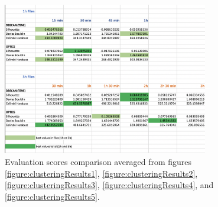 





\begin{figure}
  \centering
  \includegraphics[width=0.8\textwidth]{./images/clusteringResults/clusteringResults6.png}
  \caption{Evaluation scores comparison averaged from figures \ref{figure:clusteringResults1}, \ref{figure:clusteringResults2}, \ref{figure:clusteringResults3}, \ref{figure:clusteringResults4}, and \ref{figure:clusteringResults5}.}
  \label{figure:clusteringResults6}
\end{figure}




